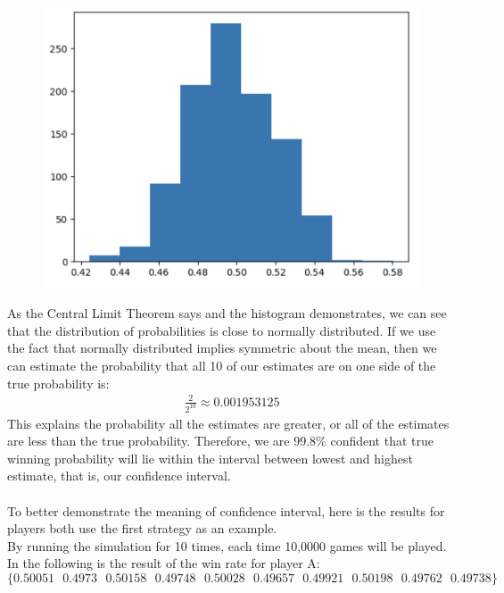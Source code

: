 \documentclass[12pt]{article}
\begin{document}
\begin{figure}[H]
\centering
\includegraphics[scale=0.5]{histogram.png}
\end{figure}
As the Central Limit Theorem says and the histogram demonstrates, we can see that the distribution of probabilities is close to normally distributed.
If we use the fact that normally distributed implies symmetric about the mean, then we can estimate the probability that all 10 of our estimates are on one side of the true probability is:
\begin{align*}
    \frac{2}{2^{10}} \approx 0.001953125
\end{align*}
This explains the probability all the estimates are greater, or all of the estimates are less than the true probability. Therefore, we are 99.8\% confident that true winning probability will lie within the interval between lowest and highest estimate, that is, our confidence interval.
~\\\\
To better demonstrate the meaning of confidence interval, here is the results for players both use the first strategy as an example.\\
By running the simulation for 10 times, each time 10,0000 games will be played. In the following is the result of the win rate for player A:
$$\{ 0.50051\textit{ } 0.4973\textit{ }0.50158 \textit{ }0.49748 \textit{ }0.50028 \textit{ }0.49657 \textit{ }0.49921 \textit{ }0.50198 \textit{ }0.49762 \textit{ }0.49738 \}$$
\end{document}
